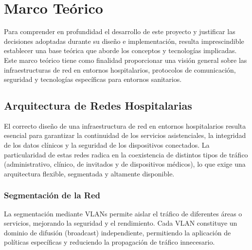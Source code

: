 
\chapter{Marco Teórico}\label{MarcoTeórico}
Para comprender en profundidad el desarrollo de este proyecto y justificar las decisiones adoptadas durante su diseño e implementación, resulta imprescindible establecer 
una base teórica que aborde los conceptos y tecnologías implicadas. Este marco teórico tiene como finalidad proporcionar una visión general sobre las 
infraestructuras de red en entornos hospitalarios, protocolos de comunicación, seguridad y tecnologías específicas para entornos sanitarios.

\section{Arquitectura de Redes Hospitalarias}
El correcto diseño de una infraestructura de red en entornos hospitalarios resulta esencial para garantizar la continuidad de los servicios asistenciales, la 
integridad de los datos clínicos y la seguridad de los dispositivos conectados. La particularidad de estas redes radica en la coexistencia de distintos tipos de 
tráfico (administrativo, clínico, de invitados y de dispositivos médicos), lo que exige una arquitectura flexible, segmentada y altamente disponible.

\subsection{Segmentación de la Red}
La segmentación mediante VLANs permite aislar el tráfico de diferentes áreas o servicios, mejorando la seguridad y el rendimiento. 
Cada VLAN constituye un dominio de difusión (broadcast) independiente, permitiendo la aplicación de políticas específicas y reduciendo la propagación de tráfico innecesario.

